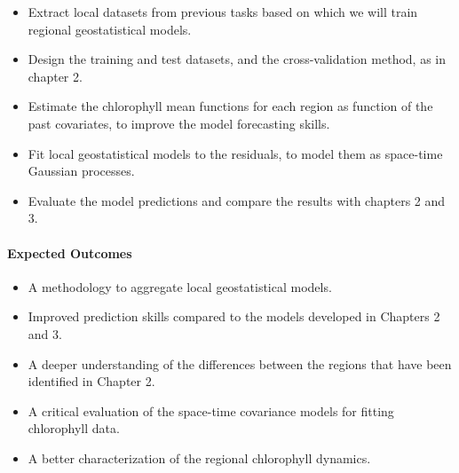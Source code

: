 \begin{itemize}

\item Extract local datasets from previous tasks based on which we will train
regional geostatistical models.

\item Design the training and test datasets, and the cross-validation method,
as in chapter 2.

\item Estimate the chlorophyll mean functions for each region as function of
the past covariates, to improve the model forecasting skills.

\item Fit local geostatistical models to the residuals, to model them as
space-time Gaussian processes.

\item Evaluate the model predictions and compare the results with chapters 2
and 3.

\end{itemize}

\paragraph{Expected Outcomes}

\begin{itemize}

\item A methodology to aggregate local geostatistical models.

\item Improved prediction skills compared to the models developed in Chapters 2
and 3.

\item A deeper understanding of the differences between the regions that have been
identified in Chapter 2.

\item A critical evaluation of the space-time covariance models for fitting
chlorophyll data.

\item A better characterization of the regional chlorophyll dynamics.

\end{itemize}
